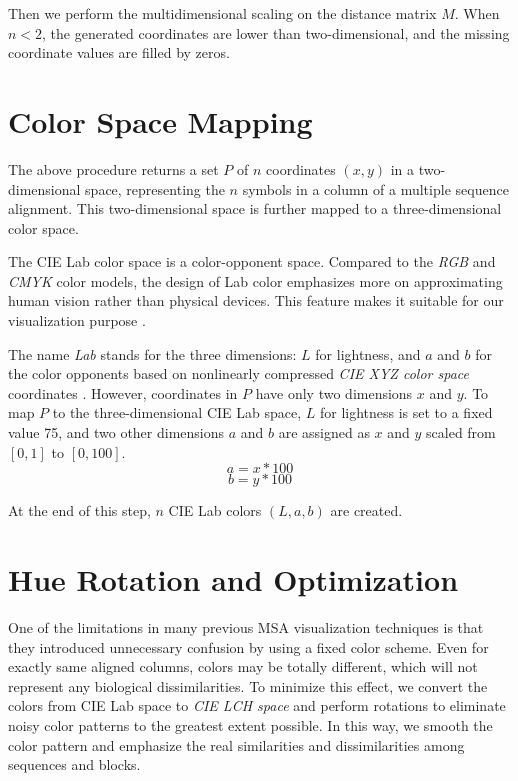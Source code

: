 Then we perform the multidimensional scaling on the distance matrix $M$. When $n<2$, the generated coordinates are lower than two-dimensional, and the missing coordinate values are filled by zeros.

\section{Color Space Mapping}

The above procedure returns a set $P$ of $n$ coordinates $(x,y)$ in a two-dimensional space, representing the $n$ symbols in a column of a multiple sequence alignment. This two-dimensional space is further mapped to a three-dimensional color space.

The CIE Lab color space \cite {McLAREN:1976aa} is a color-opponent space. Compared to the \emph{RGB} and \emph{CMYK} color models, the design of Lab color emphasizes more on approximating human vision rather than physical devices. This feature makes it suitable for our visualization purpose \cite{Margulis:2005aa}.

The name \emph{Lab} stands for the three dimensions: $L$ for lightness, and $a$ and $b$ for the color opponents based on nonlinearly compressed \emph{CIE XYZ color space} coordinates \cite{CIE:1932aa,Smith:1931aa}. However, coordinates in $P$ have only two dimensions $x$ and $y$. To map $P$ to the three-dimensional CIE Lab space, $L$ for lightness is set to a fixed value 75, and two other dimensions $a$ and $b$ are assigned as $x$ and $y$ scaled from $[0,1]$ to $[0, 100]$. $$a=x*100$$ $$b=y*100$$

At the end of this step, $n$ CIE Lab colors $(L, a, b)$ are created.

\section{Hue Rotation and Optimization}\label{sec:rotation}

One of the limitations in many previous MSA visualization techniques is that they introduced unnecessary confusion by using a fixed color scheme. Even for exactly same aligned columns, colors may be totally different, which will not represent any biological dissimilarities. To minimize this effect, we convert the colors from CIE Lab space to \emph{CIE LCH space} and perform rotations to eliminate noisy color patterns to the greatest extent possible. In this way, we smooth the color pattern and emphasize the real similarities and dissimilarities among sequences and blocks.

